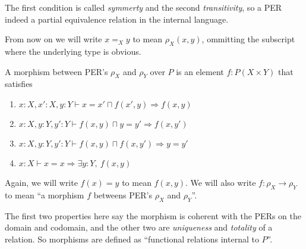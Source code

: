 The first condition is called \emph{symmerty} and the second \emph{transitivity}, so a PER indeed a partial equivalence relation in the internal language.

From now on we will write \(x =_X y\) to mean \(ρ_X(x,y)\), ommitting the subscript where the underlying type is obvious.

\begin{definition}
    A morphism between PER's \(ρ_X\) and \(ρ_Y\) over \(P\) is an element \(f : P(X × Y)\) that satisfies
    \begin{enumerate}
        \item \(x : X, x' : X, y : Y ⊢ x = x'  ⊓ f(x', y) ⇒ f(x, y)\)
        \item \(x : X, y : Y, y' : Y ⊢ f(x, y) ⊓ y = y'   ⇒ f(x, y')\)
        \item \(x : X, y : Y, y' : Y ⊢ f(x, y) ⊓ f(x, y') ⇒ y = y'\)
        \item \(x : X                ⊢ x = x              ⇒ ∃ y : Y,\ f(x, y)\)
    \end{enumerate}
\end{definition}

\begin{remark}
    Again, we will write \(f(x) = y\) to mean \(f(x, y)\).
    We will also write \(f : ρ_X → ρ_Y\) to mean ``a morphism \(f\) betweens PER's \(ρ_X\) and \(ρ_Y\)''.
\end{remark}

The first two properties here say the morphism is coherent with the PERs on the domain and codomain, and the other two are \emph{uniqueness} and \emph{totality} of a relation. So morphisms are defined as ``functional relations internal to \(P\)''.

\newtheorem{construction}{Construction}

